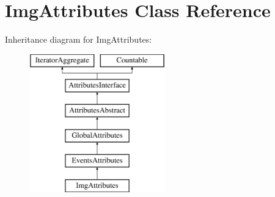 \hypertarget{class_pes_1_1_dom_1_1_node_1_1_attributes_1_1_img_attributes}{}\section{Img\+Attributes Class Reference}
\label{class_pes_1_1_dom_1_1_node_1_1_attributes_1_1_img_attributes}
Inheritance diagram for Img\+Attributes\+:\begin{figure}[H]
\begin{center}
\leavevmode
\includegraphics[height=6.000000cm]{class_pes_1_1_dom_1_1_node_1_1_attributes_1_1_img_attributes}
\end{center}
\end{figure}
